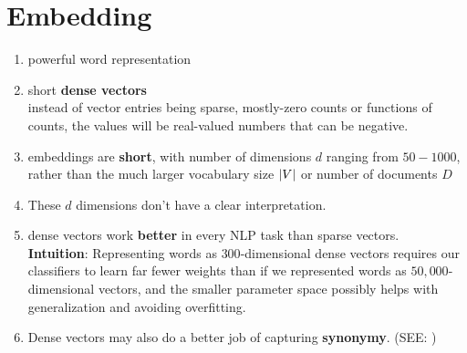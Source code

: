 \section{Embedding \cite{nlp-1}}\label{Embedding}
\begin{enumerate}
    \item powerful word representation
    
    \item short \textbf{dense vectors} \\
    instead of vector entries being sparse, mostly-zero counts or functions of counts, the values will be real-valued numbers that can be negative.

    \item embeddings are \textbf{short}, with number of dimensions $d$ ranging from $50-1000$, rather than the much larger vocabulary size $\left| V \right|$ or number of documents $D$

    \item These $d$ dimensions don’t have a clear interpretation.

    \item dense vectors work \textbf{better} in every NLP task than sparse vectors.\\
    \textbf{Intuition}: Representing words as $300$-dimensional dense vectors requires our classifiers to learn far fewer weights than if we represented words as $50,000$-dimensional vectors, and the smaller parameter space possibly helps with generalization and avoiding overfitting.

    \item Dense vectors may also do a better job of capturing \textbf{synonymy}. (SEE: )

    
\end{enumerate}

